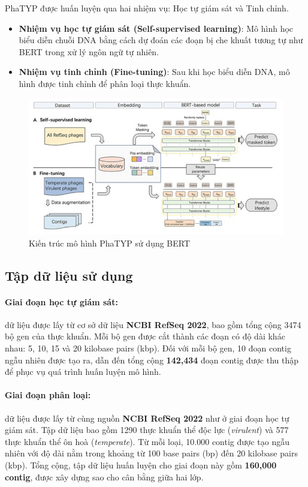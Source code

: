 PhaTYP được huấn luyện qua hai nhiệm vụ: Học tự giám sát và Tinh chỉnh. 
\begin{itemize}
    \item \textbf{Nhiệm vụ học tự giám sát (Self-supervised learning)}: Mô hình học biểu diễn chuỗi DNA bằng cách dự đoán các đoạn bị che khuất tương tự như BERT trong xử lý ngôn ngữ tự nhiên.
    \item \textbf{Nhiệm vụ tinh chỉnh (Fine-tuning)}: Sau khi học biểu diễn DNA, mô hình được tinh chỉnh để phân loại thực khuẩn.
\end{itemize}
\begin{figure}[H]
    \centering
    \includegraphics[width=1\linewidth]{figures/PhaTYP_Model.png}
    \caption{Kiến trúc mô hình PhaTYP sử dụng BERT}
    \label{fig:enter-label}
\end{figure}

\subsection*{Tập dữ liệu sử dụng}
\paragraph{Giai đoạn học tự giám sát:} dữ liệu được lấy từ cơ sở dữ liệu \textbf{NCBI RefSeq 2022}, bao gồm tổng cộng 3474 bộ gen của thực khuẩn. Mỗi bộ gen được cắt thành các đoạn có độ dài khác nhau: 5, 10, 15 và 20 kilobase pairs (kbp). Đối với mỗi bộ gen, 10 đoạn contig ngẫu nhiên được tạo ra, dẫn đến tổng cộng \textbf{142,434} đoạn contig được thu thập để phục vụ quá trình huấn luyện mô hình.

\paragraph{Giai đoạn phân loại:} dữ liệu được lấy từ cùng nguồn \textbf{NCBI RefSeq 2022} như ở giai đoạn học tự giám sát. Tập dữ liệu bao gồm 1290 thực khuẩn thể độc lực (\textit{virulent}) và 577 thực khuẩn thể ôn hoà (\textit{temperate}). Từ mỗi loại, 10.000 contig được tạo ngẫu nhiên với độ dài nằm trong khoảng từ 100 base pairs (bp) đến 20 kilobase pairs (kbp). Tổng cộng, tập dữ liệu huấn luyện cho giai đoạn này gồm \textbf{160,000 contig}, được xây dựng sao cho cân bằng giữa hai lớp.

